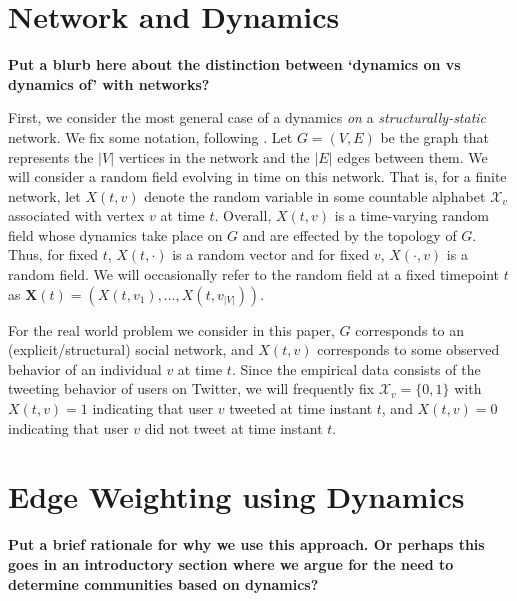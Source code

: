 \documentclass[12pt]{article}
\begin{document}
 

\section{Network and Dynamics}

\textbf{Put a blurb here about the distinction between `dynamics on vs dynamics of' with networks?}

First, we consider the most general case of a dynamics \emph{on} a \emph{structurally-static} network. We fix some notation, following \cite{kolaczyk2009statistical}. Let $G = (V, E)$ be the graph that represents the $|V|$ vertices in the network and the $|E|$ edges between them. We will consider a random field evolving in time on this network. That is, for a finite network, let $X(t, v)$ denote the random variable in some countable alphabet $\mathcal{X}_{v}$ associated with vertex $v$ at time $t$. Overall, $X(t, v)$ is a time-varying random field whose dynamics take place on $G$ and are effected by the topology of $G$. Thus, for fixed $t$, $X(t, \cdot)$ is a random vector and for fixed $v$, $X(\cdot, v)$ is a random field. We will occasionally refer to the random field at a fixed timepoint $t$ as $\mathbf{X}(t) = (X(t, v_{1}), \ldots, X(t, v_{|V|})).$

For the real world problem we consider in this paper, $G$ corresponds to an (explicit/structural) social network, and $X(t,v)$ corresponds to some observed behavior of an individual $v$ at time $t$. Since the empirical data consists of the tweeting behavior of users on Twitter, we will frequently fix $\mathcal{X}_{v} = \{0, 1\}$ with $X(t, v) = 1$ indicating that user $v$ tweeted at time instant $t$, and $X(t, v) = 0$ indicating that user $v$ did not tweet at time instant $t$.

\section{Edge Weighting using Dynamics}

\textbf{Put a brief rationale for why we use this approach. Or perhaps this goes in an introductory section where we argue for the need to determine communities based on dynamics?}
\end{document}
